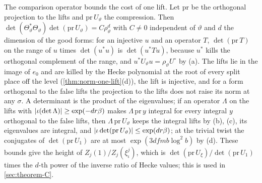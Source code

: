 The comparison operator bounds the cost of one lift. Let $\mathrm{pr}$ be the orthogonal projection to the lifts and $\mathrm{pr}\,U_\vartheta$ the compression. Then $\det(\Theta_\vartheta^*\Theta_\vartheta)\det(\mathrm{pr}\,U_\vartheta)=C\rho_\vartheta^d$ with $C\ne0$ independent of $\vartheta$ and $d$
the dimension of the good forms: for an injective $u$ and an operator $T$, $\det(\mathrm{pr}\,T)$ on the range of $u$ times $\det(u^*u)$ is $\det(u^*Tu)$, because $u^*$ kills the orthogonal complement of the range, and $u^*U_\vartheta u=\rho_\vartheta U^\circ$ by (a).
The lifts lie in the image of $e_0$ and are killed by the Hecke polynomial at the root of every split place off the level (\cref{thm:norm-one-lift}(d)), the lift is injective, and for a form orthogonal to the false lifts the projection to the
lifts does not raise its norm at any $\sigma$. A determinant is the product of the eigenvalues; if an operator $\Lambda$ on the lifts with $\lvert \iota(\det\Lambda)\rvert\ge\exp(-dr\beta)$ makes $\Lambda\,\mathrm{pr}\,y$ integral for every integral $y$ orthogonal to the false lifts, then
$\Lambda\,\mathrm{pr}\,U_\vartheta$ keeps the integral lifts by (b), (c), its eigenvalues are integral, and $\lvert \iota\det(\mathrm{pr}\,U_\vartheta)\rvert\le\exp(dr\beta)$; at the trivial twist the conjugates of $\det(\mathrm{pr}\,U_1)$ are at most $\exp(3dfmb\log^2b)$ by (d). These
bounds give the height of $Z_j(1)/Z_j(\xi^j_\iota)$, which is $\det(\mathrm{pr}\,U_\xi)/\det(\mathrm{pr}\,U_1)$ times the $d$-th power of the inverse ratio of Hecke values; this is used in \cref{sec:theorem-C}.
